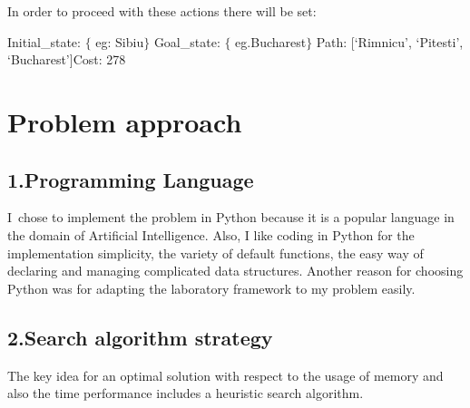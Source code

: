 \documentclass[12pt]{article}
\begin{document}
\vspace{\baselineskip}
\begin{justify}
In order to proceed with these actions there will be set:\tab 
\end{justify}\par

\tab \tab \tab \tab 
\vspace{\baselineskip}\begin{justify}
Initial\_state: $ \{ $ eg: Sibiu$ \} $ \tab \tab \tab \tab \tab \tab \tab \tab \tab Goal\_state: $ \{ $ eg.Bucharest$ \} $ \tab \tab \tab \tab \tab \tab \tab \tab \tab \tab Path: [‘Rimnicu’, ‘Pitesti’, ‘Bucharest’]\tab \tab \tab \tab \tab \tab \tab \tab Cost: 278
\end{justify}\par

\section*{Problem approach}
\subsection*{1.\hspace*{10pt}Programming Language}
\begin{adjustwidth}{0.5in}{0.0in}
\begin{justify}
I\ chose to implement the problem in Python because it is a popular language in the domain of Artificial Intelligence.  Also, I like coding in Python for the implementation simplicity, the variety of default functions, the easy way of declaring and managing complicated data structures. Another reason for choosing Python was for adapting the laboratory framework to my problem easily.
\end{justify}\par

\end{adjustwidth}

\subsection*{2.\hspace*{10pt}Search algorithm strategy}
\begin{adjustwidth}{0.5in}{0.0in}
\begin{justify}
The key idea for an optimal solution with respect to the usage of memory and also the time performance includes a heuristic search algorithm. 
\end{justify}\par

\end{adjustwidth}
\end{document}
